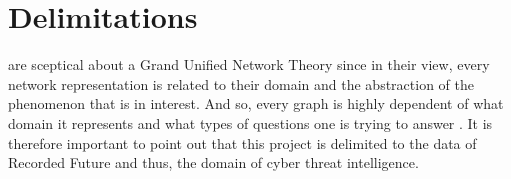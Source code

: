 \section{Delimitations}
\citet{brandes2013} are sceptical about a Grand Unified Network Theory since in their view, every network representation is related to their domain and the abstraction of the phenomenon that is in interest. And so, every graph is highly dependent of what domain it represents and what types of questions one is trying to answer \cite{hendrix2010, schroeder2007}. It is therefore important to point out that this project is delimited to the data of Recorded Future and thus, the domain of cyber threat intelligence. 

